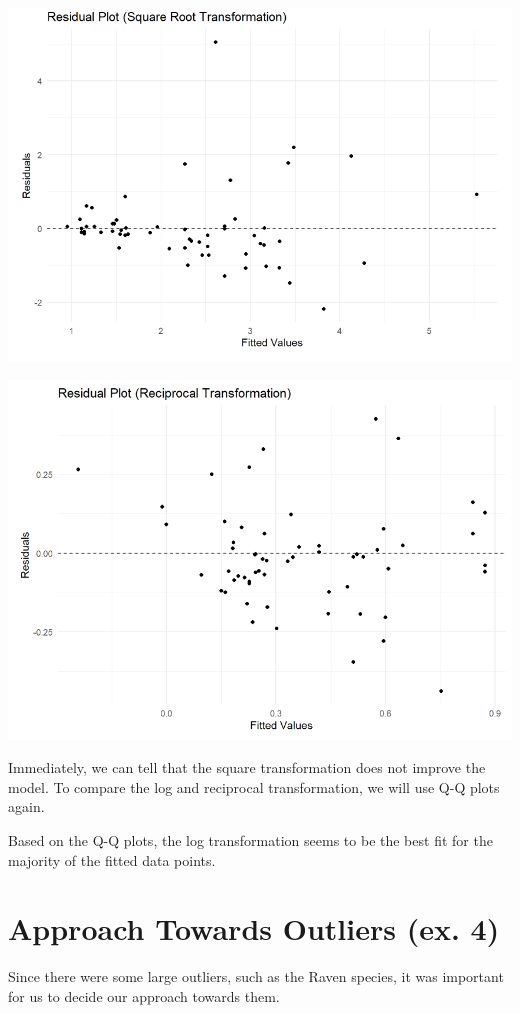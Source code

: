 \documentclass{article}
\begin{document}
\begin{center}
\includegraphics[scale=0.5]{graphs/graph-sqrt.png}
\end{center}

\begin{center}
\includegraphics[scale=0.5]{graphs/graph-over.png}
\end{center}

Immediately, we can tell that the square transformation does not improve the model. To compare the log and reciprocal transformation, we will use Q-Q plots again.

Based on the Q-Q plots, the log transformation seems to be the best fit for the majority of the fitted data points.

\section{Approach Towards Outliers (ex. 4)}
Since there were some large outliers, such as the Raven species, it was important for us to decide our approach towards them.
\end{document}
